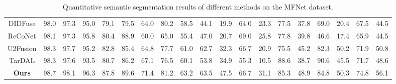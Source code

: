 \documentclass[10pt,twocolumn,letterpaper]{article}
\begin{document}
\begin{table*}[thb]
{\begin{tabular}{|c|cc|cc|cc|cc|cc|cc|cc|cc|cc|}
			\cellcolor{gray!15}DIDFuse & 98.0&	97.3&95.0&79.1& 79.5&	64.0& 80.2&	58.5	& 44.1&19.9&64.0&	23.3& 77.5&37.8&69.0& 20.4& 67.5&	44.5	 \\
			\cellcolor{gray!15}ReCoNet & 98.1 &97.3 &\cellcolor{blue!15}95.8  &	80.4 & 88.9 &60.0 &65.0 &	55.4 & 47.0 &20.7 & \cellcolor{red!15}69.0 &	25.8& 77.8 &	39.8 & 46.6 &	17.4  & 65.9 &	44.5 \\
			\cellcolor{gray!15}U2Fusion &98.3 &97.7 &95.2  &82.8 & 85.4 &64.8 &77.7 &61.0 & 62.7 &32.3 & 66.7 &20.9 & 75.5& 45.2 &82.3&\cellcolor{blue!15} 50.2&	71.9 & 50.8\\
			\cellcolor{gray!15}TarDAL & 98.3 &97.6 &93.5  &80.7 & 86.2 &67.1 & 76.5 &	60.1 & 53.8 & 34.9 & 55.3 &10.5 & \cellcolor{red!15}88.6 &38.7 & \cellcolor{red!15}90.6 &	45.5 & 71.7 &48.6 \\ 
			
			\cellcolor{yellow!15}\textbf{Ours}  &98.7&\cellcolor{blue!15}98.1 &\cellcolor{red!15}96.3  &	\cellcolor{red!15}87.8 & \cellcolor{blue!15}89.6&\cellcolor{red!15}71.4 & \cellcolor{blue!15}81.2 &	\cellcolor{red!15}63.2 & 63.5 &	\cellcolor{red!15}47.5& \cellcolor{blue!15}66.7 & 31.1 & \cellcolor{blue!15}85.3 &\cellcolor{blue!15}48.9 & \cellcolor{blue!15}84.8 &\cellcolor{red!15}50.3  & \cellcolor{blue!15}74.8 &	\cellcolor{red!15}56.1 \\
			\hline
	\end{tabular} }
	\caption{ Quantitative semantic segmentation results of different methods on the {MFNet} dataset.}~\label{tab:123}
\end{table*}
\end{document}
